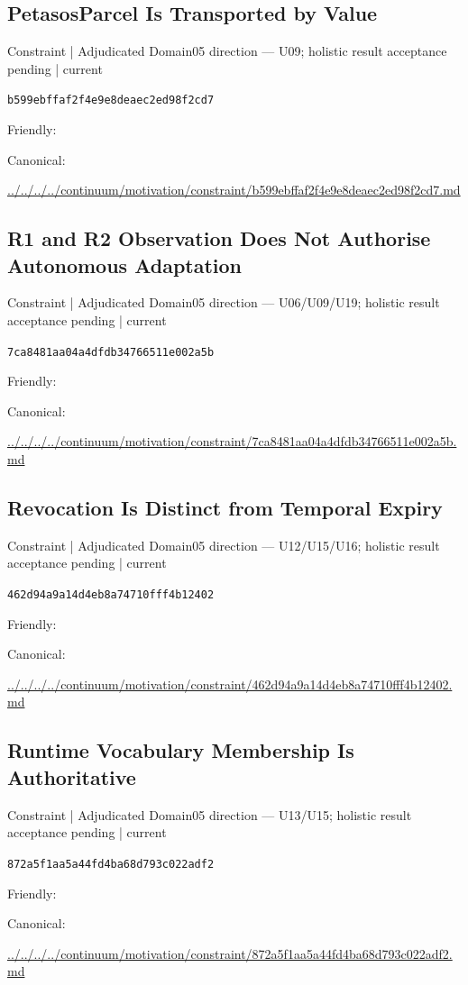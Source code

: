 \documentclass[10pt,a4paper]{article}
\begin{document}
\subsection*{PetasosParcel Is Transported by Value}
{\small Constraint | Adjudicated Domain05 direction — U09; holistic result acceptance pending | current}\par
\texttt{b599ebffaf2f4e9e8deaec2ed98f2cd7}\par
Friendly: \par
Canonical: \par
{\footnotesize\url{../../../../continuum/motivation/constraint/b599ebffaf2f4e9e8deaec2ed98f2cd7.md}}\par
\subsection*{R1 and R2 Observation Does Not Authorise Autonomous Adaptation}
{\small Constraint | Adjudicated Domain05 direction — U06/U09/U19; holistic result acceptance pending | current}\par
\texttt{7ca8481aa04a4dfdb34766511e002a5b}\par
Friendly: \par
Canonical: \par
{\footnotesize\url{../../../../continuum/motivation/constraint/7ca8481aa04a4dfdb34766511e002a5b.md}}\par
\subsection*{Revocation Is Distinct from Temporal Expiry}
{\small Constraint | Adjudicated Domain05 direction — U12/U15/U16; holistic result acceptance pending | current}\par
\texttt{462d94a9a14d4eb8a74710fff4b12402}\par
Friendly: \par
Canonical: \par
{\footnotesize\url{../../../../continuum/motivation/constraint/462d94a9a14d4eb8a74710fff4b12402.md}}\par
\subsection*{Runtime Vocabulary Membership Is Authoritative}
{\small Constraint | Adjudicated Domain05 direction — U13/U15; holistic result acceptance pending | current}\par
\texttt{872a5f1aa5a44fd4ba68d793c022adf2}\par
Friendly: \par
Canonical: \par
{\footnotesize\url{../../../../continuum/motivation/constraint/872a5f1aa5a44fd4ba68d793c022adf2.md}}\par
\end{document}
